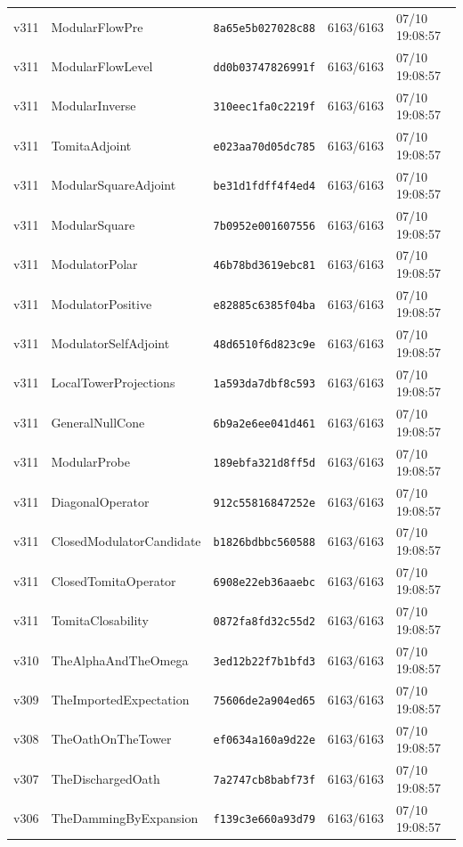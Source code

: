 \documentclass[11pt]{article}
\theoremstyle{definition}\newtheorem{deriv}{Derivation}
\begin{document}
{\begin{longtable}{@{}lllll@{}}
v311 & ModularFlowPre & \texttt{8a65e5b027028c88} & 6163/6163 & 07/10 19:08:57 \\
v311 & ModularFlowLevel & \texttt{dd0b03747826991f} & 6163/6163 & 07/10 19:08:57 \\
v311 & ModularInverse & \texttt{310eec1fa0c2219f} & 6163/6163 & 07/10 19:08:57 \\
v311 & TomitaAdjoint & \texttt{e023aa70d05dc785} & 6163/6163 & 07/10 19:08:57 \\
v311 & ModularSquareAdjoint & \texttt{be31d1fdff4f4ed4} & 6163/6163 & 07/10 19:08:57 \\
v311 & ModularSquare & \texttt{7b0952e001607556} & 6163/6163 & 07/10 19:08:57 \\
v311 & ModulatorPolar & \texttt{46b78bd3619ebc81} & 6163/6163 & 07/10 19:08:57 \\
v311 & ModulatorPositive & \texttt{e82885c6385f04ba} & 6163/6163 & 07/10 19:08:57 \\
v311 & ModulatorSelfAdjoint & \texttt{48d6510f6d823c9e} & 6163/6163 & 07/10 19:08:57 \\
v311 & LocalTowerProjections & \texttt{1a593da7dbf8c593} & 6163/6163 & 07/10 19:08:57 \\
v311 & GeneralNullCone & \texttt{6b9a2e6ee041d461} & 6163/6163 & 07/10 19:08:57 \\
v311 & ModularProbe & \texttt{189ebfa321d8ff5d} & 6163/6163 & 07/10 19:08:57 \\
v311 & DiagonalOperator & \texttt{912c55816847252e} & 6163/6163 & 07/10 19:08:57 \\
v311 & ClosedModulatorCandidate & \texttt{b1826bdbbc560588} & 6163/6163 & 07/10 19:08:57 \\
v311 & ClosedTomitaOperator & \texttt{6908e22eb36aaebc} & 6163/6163 & 07/10 19:08:57 \\
v311 & TomitaClosability & \texttt{0872fa8fd32c55d2} & 6163/6163 & 07/10 19:08:57 \\
v310 & TheAlphaAndTheOmega & \texttt{3ed12b22f7b1bfd3} & 6163/6163 & 07/10 19:08:57 \\
v309 & TheImportedExpectation & \texttt{75606de2a904ed65} & 6163/6163 & 07/10 19:08:57 \\
v308 & TheOathOnTheTower & \texttt{ef0634a160a9d22e} & 6163/6163 & 07/10 19:08:57 \\
v307 & TheDischargedOath & \texttt{7a2747cb8babf73f} & 6163/6163 & 07/10 19:08:57 \\
v306 & TheDammingByExpansion & \texttt{f139c3e660a93d79} & 6163/6163 & 07/10 19:08:57 \\

\end{longtable}}
\end{document}
